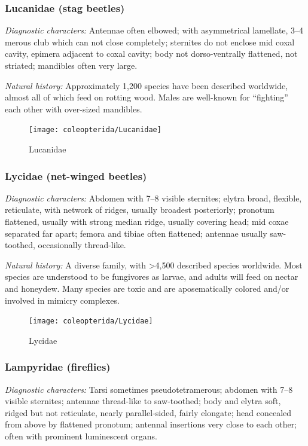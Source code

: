 \subsubsection{Lucanidae (stag beetles)}
\noindent{}\textit{Diagnostic characters:} Antennae often elbowed; with asymmetrical lamellate, 3--4 merous club which can not close completely; sternites do not enclose mid coxal cavity, epimera adjacent to coxal cavity; body not dorso-ventrally flattened, not striated; mandibles often very large.\vspace{3mm}

\noindent{}\textit{Natural history:} Approximately 1,200 species have been described worldwide, almost all of which feed on rotting wood. Males are well-known for ``fighting'' each other with over-sized mandibles.

\begin{figure}[ht!]
  \centering
    \texttt{[image: coleopterida/Lucanidae]}
  \caption{Lucanidae \citep[drawn from][Fig. 1F]{Lucanus2017}}
  \label{fig:lucanid1}%
\end{figure}

\subsubsection{Lycidae (net-winged beetles)}
\noindent{}\textit{Diagnostic characters:} Abdomen with 7--8 visible sternites; elytra broad, flexible, reticulate, with network of ridges, usually broadest posteriorly; pronotum flattened, usually with strong median ridge, usually covering head; mid coxae separated far apart; femora and tibiae often flattened; antennae usually saw-toothed, occasionally thread-like.\vspace{3mm}

\noindent{}\textit{Natural history:} A diverse family, with \textgreater4,500 described species worldwide. Most species are understood to be fungivores as larvae, and adults will feed on nectar and honeydew. Many species are toxic and are aposematically colored and/or involved in mimicry complexes.

\begin{figure}[ht!]
  \centering
    \texttt{[image: coleopterida/Lycidae]}
  \caption{Lycidae \citep[redrawn from][Plate V, Fig. 9]{bhlpart243991} }
  \label{fig:lycid}
\end{figure}

\subsubsection{Lampyridae (fireflies)}
\noindent{}\textit{Diagnostic characters:} Tarsi sometimes pseudotetramerous; abdomen with 7--8 visible sternites; antennae thread-like to saw-toothed; body and elytra soft, ridged but not reticulate, nearly parallel-sided, fairly elongate; head concealed from above by flattened pronotum; antennal insertions very close to each other; often with prominent luminescent organs.\vspace{3mm}

